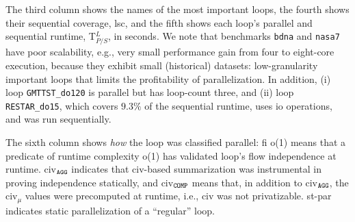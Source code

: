 \documentclass{sig-alternate}
\begin{document}
The third column shows the names of the most important loops,
the fourth shows their sequential coverage, {\sc lsc}, and the
fifth shows each loop's parallel and sequential runtime, T$_{P/S}^L$, in seconds.
%
We note that benchmarks {\tt bdna} and {\tt nasa7} have poor scalability, e.g., very small
performance gain from four to eight-core execution, because they exhibit
small (historical) datasets: low-granularity important loops that limits the 
profitability of parallelization.
In addition, (i) loop {\tt GMTTST\_do120} 
is parallel but has loop-count three, and (ii) loop {\tt RESTAR\_do15},
which covers $9.3\%$ of the sequential runtime, uses {\sc io} operations,
and was run sequentially. 

The sixth column shows {\em how} the loop was classified parallel: {\sc fi} {\sc o(1)}
means that a predicate of runtime complexity {\sc o(1)} has validated loop's flow
independence at runtime. {\sc civ}$_{\tt{}AGG}$ indicates that {\sc civ}-based summarization 
was instrumental in proving independence statically, and {\sc civ}$_{\tt{}COMP}$ means that,
in addition to {\sc civ}$_{\tt{}AGG}$, the {\sc civ}$_\mu$ values were precomputed
at runtime, i.e., {\sc civ} was not privatizable.  {\sc st-par} indicates static
parallelization of a ``regular'' loop. 




\enlargethispage{\baselineskip}
\vspace{1ex}
\end{document}
